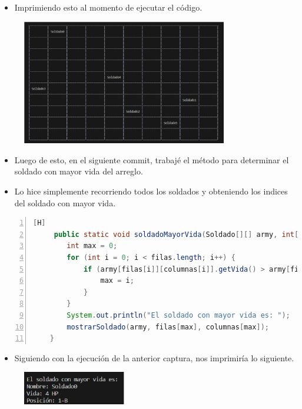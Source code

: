 \documentclass{article}
\begin{document}
	\begin{itemize}
		\item Imprimiendo esto al momento de ejecutar el código.
	\end{itemize}
	
	\begin{figure}[H]
		\centering
	\includegraphics[width=0.8\textwidth,keepaspectratio]{img/captura1.png}
	\end{figure}
	
	\begin{itemize}	
		\item Luego de esto, en el siguiente commit, trabajé el método para determinar el soldado con mayor vida del arreglo.
		\item Lo hice simplemente recorriendo todos los soldados y obteniendo los indices del soldado con mayor vida.
	\end{itemize}
	\begin{lstlisting}[language=java,caption={Soldado con mayor nivel de vida}, numbers=left][H]
	 public static void soldadoMayorVida(Soldado[][] army, int[] filas, int[] columnas) {
        int max = 0;
        for (int i = 0; i < filas.length; i++) {
            if (army[filas[i]][columnas[i]].getVida() > army[filas[max]][columnas[max]].getVida()) {
                max = i;
            }
        }
        System.out.println("El soldado con mayor vida es: ");
        mostrarSoldado(army, filas[max], columnas[max]);
    }
	\end{lstlisting}
	\begin{itemize}	
		\item Siguiendo con la ejecución de la anterior captura, nos imprimiría lo siguiente.
	\end{itemize}
	
	\begin{figure}[H]
		\centering
	\includegraphics[width=0.4\textwidth,keepaspectratio]{img/captura2.png}
	\end{figure}
	
\end{document}
